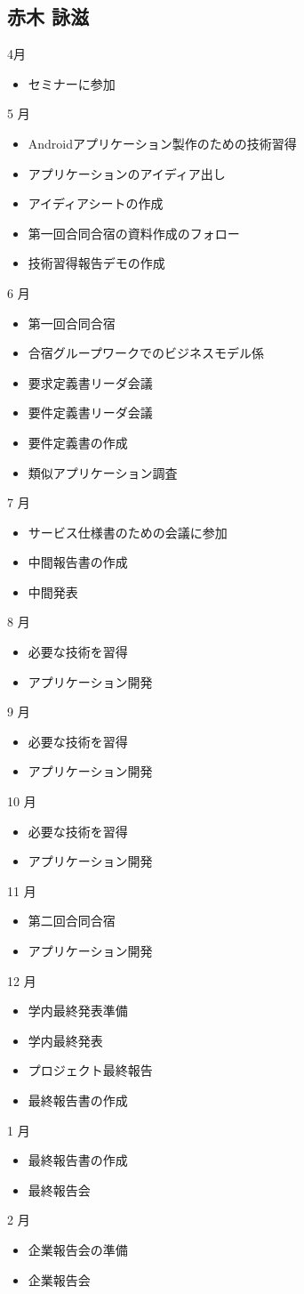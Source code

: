 \subsection{赤木 詠滋}
4月
\begin{itemize}
\item セミナーに参加
\end{itemize}
5 月
\begin{itemize}
\item Androidアプリケーション製作のための技術習得
\item アプリケーションのアイディア出し
\item アイディアシートの作成
\item 第一回合同合宿の資料作成のフォロー
\item 技術習得報告デモの作成
\end{itemize}
6 月
\begin{itemize}
\item 第一回合同合宿
\item 合宿グループワークでのビジネスモデル係
\item 要求定義書リーダ会議
\item 要件定義書リーダ会議
\item 要件定義書の作成
\item 類似アプリケーション調査
\end{itemize}
7 月
\begin{itemize}
\item サービス仕様書のための会議に参加
\item 中間報告書の作成
\item 中間発表
\end{itemize}
8 月
\begin{itemize}
\item 必要な技術を習得
\item アプリケーション開発
\end{itemize}
9 月
\begin{itemize}
\item 必要な技術を習得
\item アプリケーション開発
\end{itemize}
10 月
\begin{itemize}
\item 必要な技術を習得
\item アプリケーション開発
\end{itemize}
11 月
\begin{itemize}
\item 第二回合同合宿
\item アプリケーション開発
\end{itemize}
12 月
\begin{itemize}
\item 学内最終発表準備
\item 学内最終発表
\item プロジェクト最終報告
\item 最終報告書の作成
\end{itemize}
1 月
\begin{itemize}
\item 最終報告書の作成
\item 最終報告会
\end{itemize}
2 月
\begin{itemize}
\item 企業報告会の準備
\item 企業報告会
\end{itemize}
